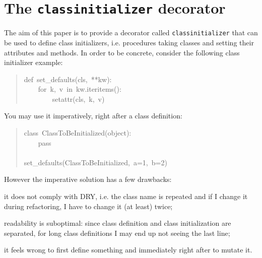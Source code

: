 \documentclass[10pt,a4paper,english]{article}
\begin{document}
\hypertarget{the-classinitializer-decorator}{}
\section*{The \texttt{classinitializer} decorator}

The aim of this paper is to provide a decorator called
\texttt{classinitializer} that can be used to define
class initializers, i.e. procedures taking classes and setting their
attributes and methods. In order to be concrete, consider the following
class initializer example:
\begin{quote}{\ttfamily \raggedright \noindent
def~set{\_}defaults(cls,~**kw):~\\
~~~~for~k,~v~in~kw.iteritems():~\\
~~~~~~~~setattr(cls,~k,~v)
}\end{quote}

You may use it imperatively, right after a class definition:
\begin{quote}{\ttfamily \raggedright \noindent
class~ClassToBeInitialized(object):~\\
~~~~pass~\\
~\\
set{\_}defaults(ClassToBeInitialized,~a=1,~b=2)
}\end{quote}

However the imperative solution has a few drawbacks:
\setcounter{listcnt0}{0}
\begin{list}{.}
{
\setlength{\rightmargin}{\leftmargin}
}
\item {} 
it does not comply with DRY, i.e. the class name is repeated
and if I change it during refactoring, I have to change it (at
least) twice;

\item {} 
readability is suboptimal: since class definition and class
initialization are separated, for long class definitions I may end
up not seeing the last line;

\item {} 
it feels wrong to first define something and immediately right
after to mutate it.

\end{list}
\end{document}
